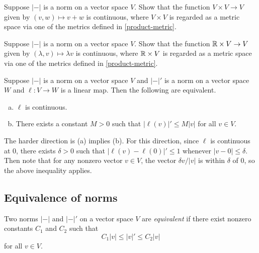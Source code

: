 \begin{exercise} \label{addition-continuous}
	Suppose $|-|$ is a norm on a vector space $V$. Show that the function $V \times V \to V$ given by $(v, w) \mapsto v+w$ is continuous, where $V \times V$ is regarded as a metric space via one of the metrics defined in \cref{product-metric}.  
\end{exercise}

\begin{exercise} \label{scalar-multiplication-continuous}
	Suppose $|-|$ is a norm on a vector space $V$. Show that the function $\mathbb{R} \times V \to V$ given by $(\lambda, v) \mapsto \lambda v$ is continuous, where $\mathbb{R} \times V$ is regarded as a metric space via one of the metrics defined in \cref{product-metric}. 
\end{exercise}

\begin{exercise} \label{bounded-continuous}
	Suppose $|-|$ is a norm on a vector space $V$ and $|-|'$ is a norm on a vector space $W$ and $\ell : V \to W$ is a linear map. Then the following are equivalent. 
	\begin{enumerate}[(a)]
		\item $\ell$ is continuous.
		\item There exists a constant $M > 0$ such that $|\ell(v)|' \leq M|v|$ for all $v \in V$. 
	\end{enumerate}
	\begin{hint}
		The harder direction is (a) implies (b). For this direction, since $\ell$ is continuous at 0, there exists $\delta > 0$ such that $|\ell(v) - \ell(0)|' \leq 1$ whenever $|v-0| \leq \delta$. Then note that for any nonzero vector $v \in V$, the vector $\delta v/|v|$ is within $\delta$ of 0, so the above inequality applies. 
	\end{hint}
\end{exercise}

\subsection{Equivalence of norms}

\begin{definition} \label{norm-equivalence-definition} 
	Two norms $|-|$ and $|-|'$ on a vector space $V$ are \emph{equivalent} if there exist nonzero constants $C_1$ and $C_2$ such that
	\[ C_1 |v| \leq |v|' \leq C_2 |v| \]
	for all $v \in V$. 
\end{definition}

